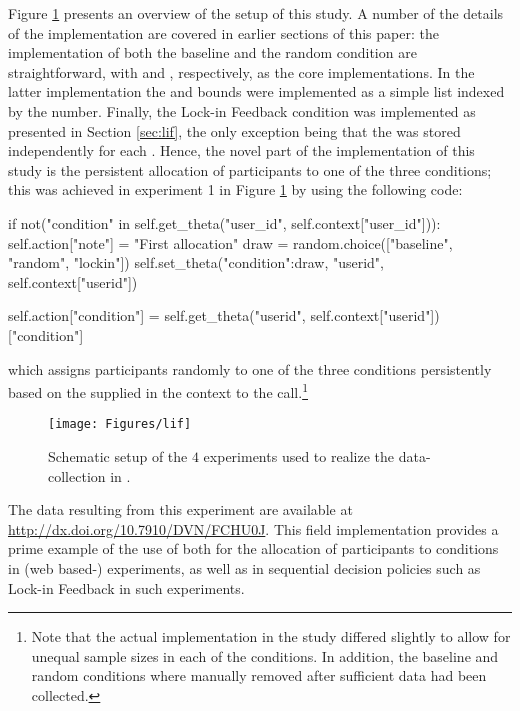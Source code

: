 \documentclass[nojss]{jss}
\begin{document}
Figure \ref{fig:lif} presents an overview of the setup of this study. A number of the details of the implementation are covered in earlier sections of this paper: the implementation of both the baseline and the random condition are straightforward, with  and , respectively, as the core  implementations. In the latter implementation the  and  bounds were implemented as a simple list indexed by the  number. Finally, the Lock-in Feedback condition was implemented as presented in Section \ref{sec:lif}, the only exception being that the  was stored independently for each . Hence, the novel part of the implementation of this study is the persistent allocation of participants to one of the three conditions; this was achieved in experiment 1 in Figure \ref{fig:lif} by using the following
 code:

 \begin{Code}
if not("condition" in self.get_theta("user_id", self.context["user_id"])):
    self.action["note"] = "First allocation"
    draw = random.choice(["baseline", "random", "lockin"])
    self.set_theta({"condition":draw}, "userid", self.context["userid"])

self.action["condition"] = 
    self.get_theta("userid", self.context["userid"])["condition"]
\end{Code}
which assigns participants randomly to one of the three conditions persistently based on the  supplied in the context to the  call.\footnote{Note that the actual implementation in the study differed slightly to allow for unequal sample sizes in each of the conditions. In addition, the baseline and random conditions where manually removed after sufficient data had been collected.}

\begin{figure}[h!]
  \centering
    \texttt{[image: Figures/lif]}
      \caption{Schematic setup of the $4$  experiments used to realize the data-collection in \citep{kaptein2016tracking}.}
      \label{fig:lif}
\end{figure}

The data resulting from this experiment are available at \url{http://dx.doi.org/10.7910/DVN/FCHU0J}. This field implementation provides a prime example of the use of  both for the allocation of participants to conditions in (web based-) experiments, as well as in sequential decision policies such as Lock-in Feedback in such experiments.
\end{document}
